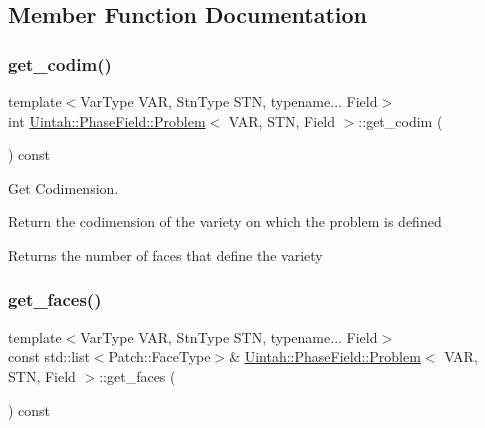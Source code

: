 \subsection{Member Function Documentation}
\mbox{\label{classUintah_1_1PhaseField_1_1Problem_ad1d8374a86011fd613e95249d74cf73f}} 
\subsubsection{\texorpdfstring{get\+\_\+codim()}{get\_codim()}}
{\footnotesize\ttfamily template$<$Var\+Type V\+AR, Stn\+Type S\+TN, typename... Field$>$ \\
int \hyperlink{classUintah_1_1PhaseField_1_1Problem}{Uintah\+::\+Phase\+Field\+::\+Problem}$<$ V\+AR, S\+TN, Field $>$\+::get\+\_\+codim (\begin{DoxyParamCaption}{ }\end{DoxyParamCaption}) const\hspace{0.3cm}{\ttfamily [inline]}}



Get Codimension. 

Return the codimension of the variety on which the problem is defined

\begin{DoxyReturn}{Returns}
the number of faces that define the variety 
\end{DoxyReturn}
\mbox{\label{classUintah_1_1PhaseField_1_1Problem_a80d11dd3a973d867f46c5f663b4c6091}} 
\subsubsection{\texorpdfstring{get\+\_\+faces()}{get\_faces()}}
{\footnotesize\ttfamily template$<$Var\+Type V\+AR, Stn\+Type S\+TN, typename... Field$>$ \\
const std\+::list$<$Patch\+::\+Face\+Type$>$\& \hyperlink{classUintah_1_1PhaseField_1_1Problem}{Uintah\+::\+Phase\+Field\+::\+Problem}$<$ V\+AR, S\+TN, Field $>$\+::get\+\_\+faces (\begin{DoxyParamCaption}{ }\end{DoxyParamCaption}) const\hspace{0.3cm}{\ttfamily [inline]}}



